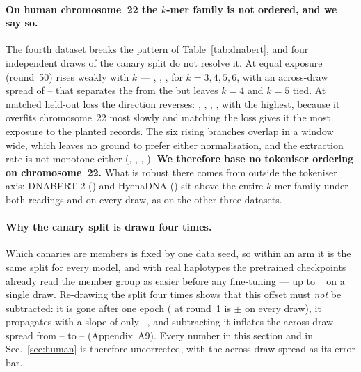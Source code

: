 \paragraph{On human chromosome~22 the $k$-mer family is not ordered, and we say so.}
The fourth dataset breaks the pattern of Table~\ref{tab:dnabert}, and four independent draws of the
canary split do not resolve it. At equal exposure (round~50) \excess{} rises weakly with $k$ ---
, , ,  for $k=3,4,5,6$, with an across-draw spread of
-- that separates the  from the  but leaves $k=4$ and $k=5$
tied. At matched held-out loss the direction reverses: , , ,
, with the  highest, because it overfits chromosome~22 most slowly and matching
the loss gives it the most exposure to the planted records. The six rising branches overlap in a
window ~\bits{} wide, which leaves no ground to prefer either normalisation, and the
extraction rate is not monotone either (, , , ). \textbf{We
therefore base no tokeniser ordering on chromosome~22.} What is robust there comes from outside the
tokeniser axis: DNABERT-2 () and HyenaDNA () sit above the entire $k$-mer family
under both readings and on every draw, as on the other three datasets.

\paragraph{Why the canary split is drawn four times.}
Which canaries are members is fixed by one data seed, so within an arm it is the same split for
every model, and with real haplotypes the pretrained checkpoints already read the member group as
easier before any fine-tuning --- up to ~\bits{} on a single draw. Re-drawing the split
four times shows that this offset must \emph{not} be subtracted: it is gone after one epoch
(\excess{} at round~1 is $\pm$ on every draw), it propagates with a slope of
only --, and subtracting it inflates the across-draw spread from
-- to -- (Appendix~A9). Every number in this section and in
Sec.~\ref{sec:human} is therefore uncorrected, with the across-draw spread as its error bar.

